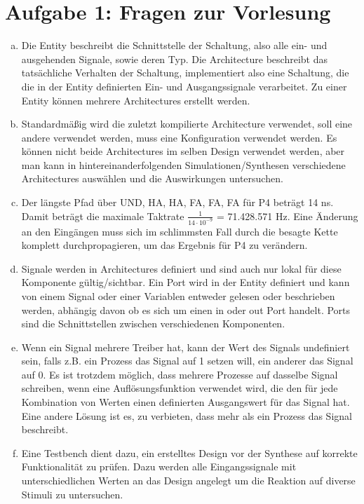 \documentclass[a4paper]{scrartcl}
\begin{document}
	
	\section*{Aufgabe 1: Fragen zur Vorlesung}
	
	\begin{enumerate}[(a)]
		\item Die Entity beschreibt die Schnittstelle der Schaltung, also alle ein- und ausgehenden Signale, sowie deren Typ. Die Architecture beschreibt das tatsächliche Verhalten der Schaltung, implementiert also eine Schaltung, die die in der Entity definierten Ein- und Ausgangssignale verarbeitet. Zu einer Entity können mehrere Architectures erstellt werden.
		
		\item Standardmäßig wird die zuletzt kompilierte Architecture verwendet, soll eine andere verwendet werden, muss eine Konfiguration verwendet werden. Es können nicht beide Architectures im selben Design verwendet werden, aber man kann in hintereinanderfolgenden Simulationen/Synthesen verschiedene Architectures auswählen und die Auswirkungen untersuchen.
		
		
		\item Der längste Pfad über UND, HA, HA, FA, FA, FA für P4 beträgt 14 ns. Damit beträgt die maximale Taktrate $\frac{1}{14\cdot10^{-9}}$ = 71.428.571 Hz. Eine Änderung an den Eingängen muss sich im schlimmsten Fall durch die besagte Kette komplett durchpropagieren, um das Ergebnis für P4 zu verändern.
		
		\item Signale werden in Architectures definiert und sind auch nur lokal für diese Komponente gültig/sichtbar. Ein Port wird in der Entity definiert und kann von einem Signal oder einer Variablen entweder gelesen oder beschrieben werden, abhängig davon ob es sich um einen in oder out Port handelt. Ports sind die Schnittstellen zwischen verschiedenen Komponenten.
		
		\item Wenn ein Signal mehrere Treiber hat, kann der Wert des Signals undefiniert sein, falls z.B. ein Prozess das Signal auf 1 setzen will, ein anderer das Signal auf 0. Es ist trotzdem möglich, dass mehrere Prozesse auf dasselbe Signal schreiben, wenn eine Auflösungsfunktion verwendet wird, die den für jede Kombination von Werten einen definierten Ausgangswert für das Signal hat. Eine andere Lösung ist es, zu verbieten, dass mehr als ein Prozess das Signal beschreibt.
		
		\item  Eine Testbench dient dazu, ein erstelltes Design vor der Synthese auf korrekte Funktionalität zu prüfen. Dazu werden alle Eingangssignale mit unterschiedlichen Werten an das Design angelegt um die Reaktion auf diverse Stimuli zu untersuchen.		
	
	\end{enumerate}
\end{document}
